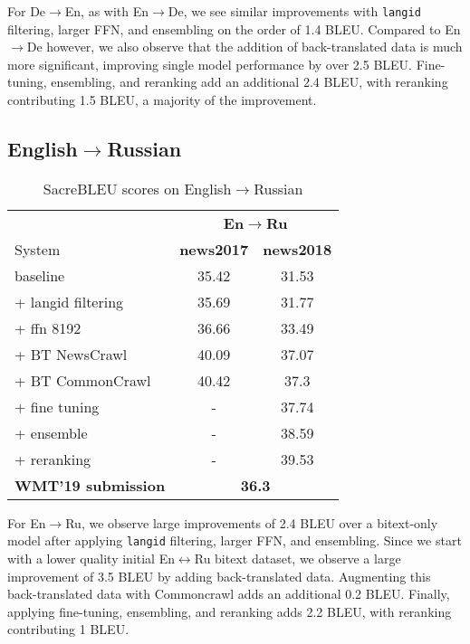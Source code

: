 \documentclass[11pt,a4paper]{article}
\newcommand{\entode}{En$\rightarrow$De}
\newcommand{\detoen}{De$\rightarrow$En}
\newcommand{\entoru}{En$\rightarrow$Ru}
\newcommand{\enbiru}{En$\leftrightarrow$Ru}
\begin{document}
For \detoen{}, as with \entode{}, we see similar improvements with \texttt{langid} filtering, larger FFN, and ensembling on the order of 1.4 BLEU.
Compared to \entode{} however, we also observe that the addition of back-translated data is much more significant, improving single model performance by over 2.5 BLEU. 
Fine-tuning, ensembling, and reranking add an additional 2.4 BLEU, with reranking contributing 1.5 BLEU, a majority of the improvement.

\subsection{English$\rightarrow$Russian}
\begin{table}[t]
\centering
\begin{tabular}{lcc}
\toprule
& \multicolumn{2}{c}{\textbf{\entoru{}}} \\
System & \bf news2017 & \bf news2018 \\ \midrule
baseline & 35.42 & 31.53 \\ 
+ langid filtering & 35.69 & 31.77 \\
+ ffn 8192 & 36.66 &  33.49\\
+ BT NewsCrawl & 40.09 &  37.07 \\
+ BT CommonCrawl & 40.42 & 37.3 \\
+ fine tuning & - & 37.74 \\
+ ensemble & -  & 38.59 \\
+ reranking & -  & 39.53 \\
\midrule
\bf WMT'19 submission & \multicolumn{2}{c}{\bf 36.3} \\ 
\bottomrule
\end{tabular}
\caption{SacreBLEU scores on English$\rightarrow$Russian }
\label{tab:ablation_enru}
\end{table}

For \entoru{}, we observe large improvements of 2.4 BLEU over a bitext-only model after applying \texttt{langid} filtering, larger FFN, and ensembling. 
Since we start with a lower quality initial \enbiru{} bitext dataset, we observe a large improvement of 3.5 BLEU by adding back-translated data.
Augmenting this back-translated data with Commoncrawl adds an additional 0.2 BLEU.
Finally, applying fine-tuning, ensembling, and reranking adds 2.2 BLEU, with reranking contributing 1 BLEU.
\end{document}
